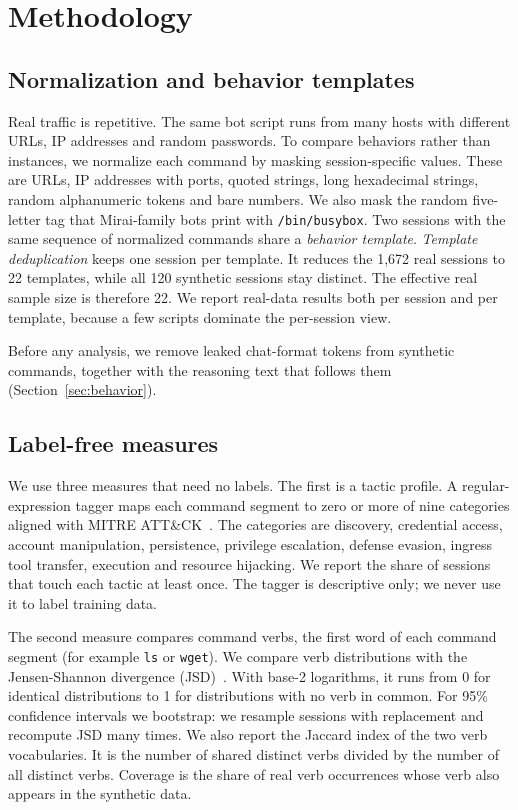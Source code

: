 \documentclass[conference]{IEEEtran}
\newcommand{\cmd}[1]{\texttt{#1}}
\begin{document}
\section{Methodology}\label{sec:method}

\subsection{Normalization and behavior templates}
Real traffic is repetitive. The same bot script runs from many hosts with different URLs, IP addresses and random passwords. To compare behaviors rather than instances, we normalize each command by masking session-specific values. These are URLs, IP addresses with ports, quoted strings, long hexadecimal strings, random alphanumeric tokens and bare numbers. We also mask the random five-letter tag that Mirai-family bots print with \cmd{/bin/busybox}. Two sessions with the same sequence of normalized commands share a \emph{behavior template}. \emph{Template deduplication} keeps one session per template. It reduces the 1,672 real sessions to 22 templates, while all 120 synthetic sessions stay distinct. The effective real sample size is therefore 22. We report real-data results both per session and per template, because a few scripts dominate the per-session view.

Before any analysis, we remove leaked chat-format tokens from synthetic commands, together with the reasoning text that follows them (Section~\ref{sec:behavior}).

\subsection{Label-free measures}
We use three measures that need no labels. The first is a tactic profile. A regular-expression tagger maps each command segment to zero or more of nine categories aligned with MITRE ATT\&CK~\cite{strom2018attack}. The categories are discovery, credential access, account manipulation, persistence, privilege escalation, defense evasion, ingress tool transfer, execution and resource hijacking. We report the share of sessions that touch each tactic at least once. The tagger is descriptive only; we never use it to label training data.

The second measure compares command verbs, the first word of each command segment (for example \cmd{ls} or \cmd{wget}). We compare verb distributions with the Jensen-Shannon divergence (JSD)~\cite{lin1991jsd}. With base-2 logarithms, it runs from 0 for identical distributions to 1 for distributions with no verb in common. For 95\% confidence intervals we bootstrap: we resample sessions with replacement and recompute JSD many times. We also report the Jaccard index of the two verb vocabularies. It is the number of shared distinct verbs divided by the number of all distinct verbs. Coverage is the share of real verb occurrences whose verb also appears in the synthetic data.
\end{document}
